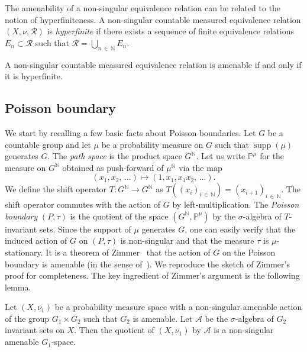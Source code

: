 \documentclass[AHL,Unicode,longabstracts,published]{cedram}
\DeclareMathOperator{\supp}{supp}
\newcommand{\bbN}{\mathbb{N}}
\newcommand{\bbP}{\mathbb{P}}
\newcommand{\calR}{\mathcal{R}}
\newcommand{\calA}{\mathcal{A}}
\begin{document}
The amenability of a non-singular equivalence relation can be related to the notion of hyperfiniteness. A non-singular countable measured equivalence relation $(X,\nu,\calR)$ is \emph{hyperfinite} if there exists a sequence of finite equivalence relations $E_n\subset \calR$ such that $\calR=\bigcup_{n\,\in\,\bbN}E_n.$


\begin{theo}\label{thm:CFW}
A non-singular countable measured equivalence relation is amenable if and only if it is hyperfinite.
\end{theo}

\subsection{Poisson boundary}

We start by recalling a few basic facts about Poisson boundaries. Let $G$ be a countable group and let $\mu$ be a probability measure on $G$ such that $\supp(\mu)$ generates $G$. The \emph{path space} is the product space $G^\bbN$. Let us write $\bbP^\mu$ for the measure on $G^\bbN$ obtained as push-forward of $\mu^\bbN$ via the map
\[
(x_1,x_2,\,\ldots)\mapsto (1, x_1,x_1x_2,\,\ldots).
\]
We define the shift operator $T:G^\bbN\to G^\bbN$ as $T((x_i)_{i\,\in\,\bbN})=(x_{i+1})_{i\,\in\,\bbN}$. The shift operator commutes with the action of $G$ by left-multiplication. The \emph{Poisson boundary} $(P,\tau)$ is the quotient of the space $(G^\bbN,\bbP^\mu)$ by the $\sigma$-algebra of $T$-invariant sets. Since the support of $\mu$ generates $G$, one can easily verify that the induced action of $G$ on $(P,\tau)$ is non-singular and that the measure $\tau$ is $\mu$-stationary. It is a theorem of Zimmer~\cite{Zimmer78} that the action of $G$ on the Poisson boundary is amenable (in the sense of~\cite{Zimmer78}). We reproduce the sketch of Zimmer's proof for completeness. The key ingredient of Zimmer's argument is the following lemma.

\begin{lemm}\label{lem:QuotientAm}
Let $(X,\nu_1)$ be a probability measure space with a non-singular amenable action of the group $G_1\times G_2$ such that $G_2$ is amenable. Let $\calA$ be the $\sigma$-algebra of $G_2$ invariant sets on $X$. Then the quotient of $(X,\nu_1)$ by $\calA$ is a non-singular amenable $G_1$-space.
\end{lemm}
\end{document}

